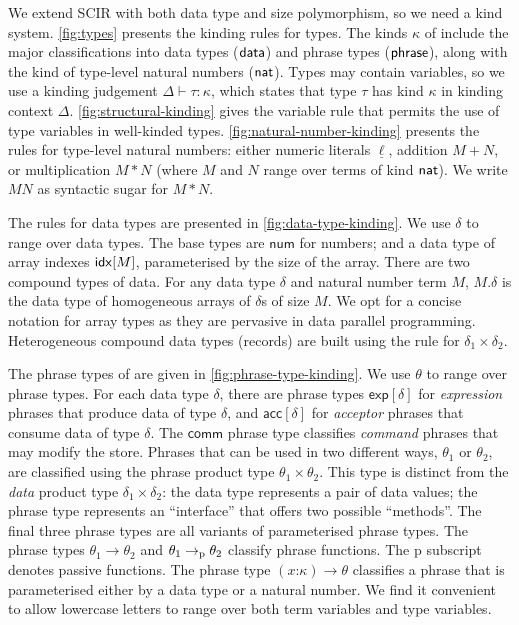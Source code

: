 We extend SCIR with both data type and size polymorphism, so we need a kind system. \autoref{fig:types} presents the kinding rules for \DPIA types. The kinds $\kappa$ of \DPIA include the major classifications into data types ($\mathsf{data}$) and phrase types ($\mathsf{phrase}$), along with the kind of type-level natural numbers ($\mathsf{nat}$). Types may contain variables, so we use a kinding judgement $\Delta \vdash \tau : \kappa$, which states that type $\tau$ has kind $\kappa$ in kinding context $\Delta$. \autoref{fig:structural-kinding} gives the variable rule that permits the use of type variables in well-kinded types. \autoref{fig:natural-number-kinding} presents the rules for type-level natural numbers: either numeric literals $\underline{\ell}$, addition $M + N$, or multiplication $M * N$ (where $M$ and $N$ range over terms of kind $\mathsf{nat}$). We write $M N$ as syntactic sugar for $M * N$.

The rules for data types are presented in \autoref{fig:data-type-kinding}. We use $\delta$ to range over data types. The base types are $\mathsf{num}$ for numbers; and a data type of array indexes $\mathsf{idx}[M]$, parameterised by the size of the array. There are two compound types of data. For any data type $\delta$ and natural number term $M$, $M.\delta$ is the data type of homogeneous arrays of $\delta$s of size $M$. We opt for a concise notation for array types as they are pervasive in data parallel programming. Heterogeneous compound data types (records) are built using the rule for $\delta_1 \times \delta_2$.

The phrase types of \DPIA are given in \autoref{fig:phrase-type-kinding}. We use $\theta$ to range over phrase types. For each data type $\delta$, there are phrase types $\mathsf{exp}[\delta]$ for \emph{expression} phrases that produce data of type $\delta$, and $\mathsf{acc}[\delta]$ for \emph{acceptor} phrases that consume data of type $\delta$. The $\mathsf{comm}$ phrase type classifies \emph{command} phrases that may modify the store. Phrases that can be used in two different ways, $\theta_1$ or $\theta_2$, are classified using the phrase product type $\theta_1 \times \theta_2$. This type is distinct from the \emph{data} product type $\delta_1 \times \delta_2$: the data type represents a pair of data values; the phrase type represents an ``interface'' that offers two possible ``methods''.
The final three phrase types are all variants of parameterised phrase types. The phrase types $\theta_1 \to \theta_2$ and $\theta_1 \to_{\textrm{p}} \theta_2$ classify phrase functions. The $\mathrm{p}$ subscript denotes passive functions. The phrase type $(x\mathord:\kappa) \to \theta$ classifies a phrase that is parameterised either by a data type or a natural number. We find it convenient to allow lowercase letters to range over both term variables and type variables.

